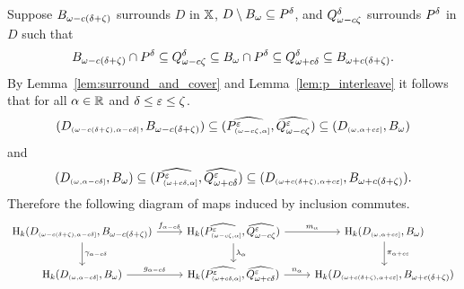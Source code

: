 
Suppose $\b$ surrounds $D$ in $\X$, $D\setminus\B\subseteq \P$, and $\Q^\of$ surrounds $\P$ in $D$ such that
\[ \b\cap \P \subseteq \Q^\of\subseteq \B\cap \P\subseteq \QQ^\of\subseteq \BB.\]
By Lemma~\ref{lem:surround_and_cover} and Lemma~\ref{lem:p_interleave} it follows that for all $\alpha\in\R$ and $\delta\leq\e\leq\zeta$.
\[ (D\subi{\omega-c(\delta+\zeta),\alpha-c\delta},\b)\subseteq (\ext{P^\e\subi{\omega-c\zeta,\alpha}},\ext{\Q^\e})\subseteq (D\subi{\omega,\alpha+c\e},\B)\]
and
\[ (D\subi{\omega,\alpha-c\delta},\B)\subseteq (\ext{P^\e\subi{\omega+c\delta,\alpha}},\ext{\QQ^\e})\subseteq (D\subi{\omega+c(\delta+\zeta),\alpha+c\e},\BB).\]
Therefore the following diagram of maps induced by inclusion commutes.
\begin{equation}\label{dgm:interleaving2}
\begin{tikzcd}
  \hom_k(D\subi{\omega-c(\delta+\zeta), \alpha-c\of}, \b)\arrow{r}{f_{\alpha-c\delta}}\arrow{d}{\gamma_{\alpha-c\delta}} &
  \hom_k(\ext{P^\e\subi{\omega-c\zeta,\alpha}},\ext{\Q^\e})\arrow{r}{m_\alpha}\arrow{d}{\lambda_\alpha} &
  \hom_k(D\subi{\omega,\alpha+c\e}, \B)\arrow{d}{\pi_{\alpha+c\e}}\\
  \hom_k(D\subi{\omega,\alpha-c\of}, \B)\arrow{r}{g_{\alpha-c\of}} &
  \hom_k(\ext{P^\e\subi{\omega+c\of,\alpha}}, \ext{\QQ^\e})\arrow{r}{n_\alpha} &
  \hom_k(D\subi{\omega+c(\delta+\zeta),\alpha+c\e}, \BB)
\end{tikzcd}\end{equation}


